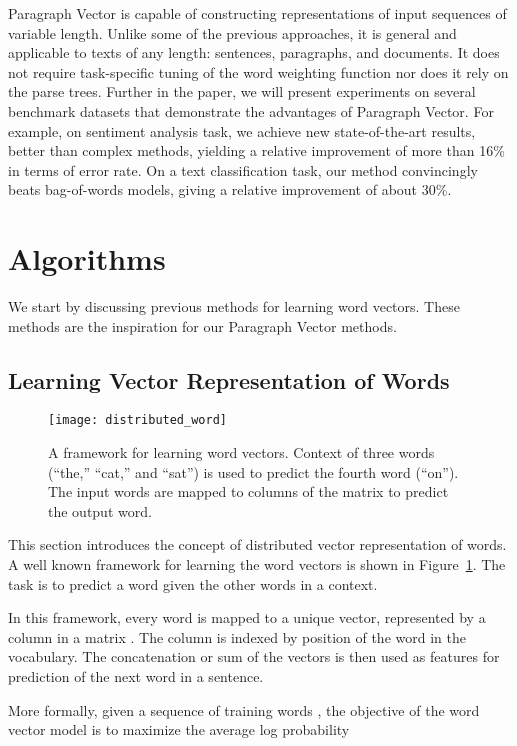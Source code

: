 \documentclass{article}
\begin{document}
Paragraph Vector is capable of constructing representations of input
sequences of variable length. Unlike some of the previous approaches,
it is general and applicable to texts of any length: sentences,
paragraphs, and documents.  It does not require task-specific tuning
of the word weighting function nor does it rely on the parse trees.
Further in the paper, we will present experiments on several benchmark
datasets that demonstrate the advantages of Paragraph Vector. For
example, on sentiment analysis task, we achieve new state-of-the-art
results, better than complex methods, yielding a relative improvement
of more than 16\% in terms of error rate. On a text classification
task, our method convincingly beats bag-of-words models, giving a
relative improvement of about 30\%.

\section{Algorithms}
We start by discussing previous methods for learning word
vectors. These methods are the inspiration for our Paragraph Vector
methods.

\subsection{Learning Vector Representation of Words}

\begin{figure}[bht]
\texttt{[image: distributed\_word]}
\caption{A framework for learning word vectors. Context of three words
  (``the,'' ``cat,'' and ``sat'') is used to predict the fourth word
  (``on''). The input words are mapped to columns of the matrix  to
  predict the output word.}
\label{fig:lm}
\end{figure}


This section introduces the concept of distributed vector
representation of words.  A well known framework for learning the word
vectors is shown in Figure~\ref{fig:lm}. The task is to predict a word
given the other words in a context.

In this framework, every word is mapped to a unique vector,
represented by a column in a matrix . The column is indexed by
position of the word in the vocabulary. The concatenation or sum of
the vectors is then used as features for prediction of the next word
in a sentence.  

More formally, given a sequence of training words , the objective of the word vector model is to maximize the
average log probability
\end{document}
